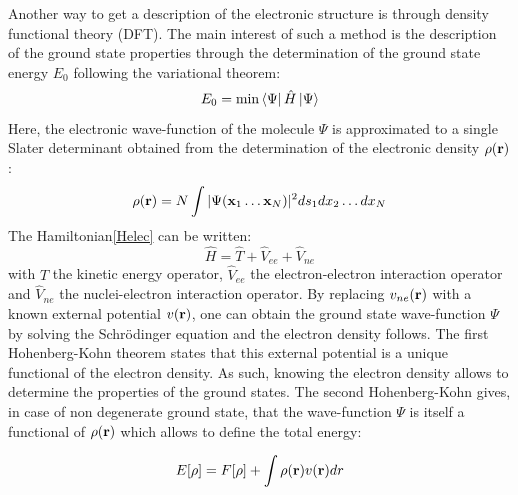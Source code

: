 \documentclass[12pt,a4paper]{report}
\numberwithin{equation}{section}
\begin{document}
Another way to get a description of the electronic structure is through density functional theory (DFT).
The main interest of such a method is the description of the ground state properties through the determination of the ground state energy $E_0$ following the variational theorem:
\begin{equation}
    E_0 = \min \bra{\Psi} \hat{H} \ket{\Psi}
\end{equation}
Here, the electronic wave-function of the molecule $\Psi$ is approximated to a single Slater determinant obtained from the determination of the electronic density $\rho(\vb r)$:
\begin{equation}
    \rho(\vb r)=N\int |\Psi(\vb x_1 \ldots \vb x_N)|^2 ds_1 dx_2 \ldots dx_N
\end{equation}
The Hamiltonian\ref{Helec} can be written:
\begin{equation}\label{Hop}
    \hat{H}=\hat{T} + \hat{V}_{ee} + \hat{V}_{ne}
\end{equation} 
with $\hat{T}$ the kinetic energy operator, $\hat{V}_{ee}$ the electron-electron interaction operator and $\hat{V}_{ne}$ the nuclei-electron interaction operator. 
By replacing $v_{ne}(\vb r)$ with a known external potential $v(\vb r)$, one can obtain the ground state wave-function $\Psi$ by solving the Schr\"odinger equation and the electron density follows.
The first Hohenberg-Kohn theorem states that this external potential is a unique functional of the electron density.\cite{hohenberg_inhomogeneous_1964}
As such, knowing the electron density allows to determine the properties of the ground states.
The second Hohenberg-Kohn gives, in case of non degenerate ground state, that the wave-function $\Psi$ is itself a functional of $\rho(\vb r)$ which allows to define the total energy:

\begin{equation}\label{EnergyDFT}
    E[\rho]= F[\rho]+ \int \rho(\vb r) v(\vb r)dr
\end{equation}
\end{document}
